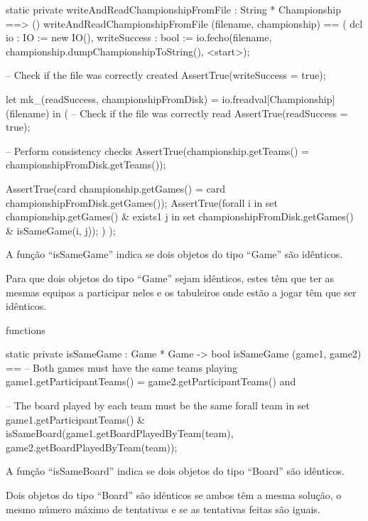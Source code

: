 \begin{vdm_al}  
    static private writeAndReadChampionshipFromFile : String * Championship ==> ()
    writeAndReadChampionshipFromFile (filename, championship) == (
      dcl io : IO := new IO(),
      writeSuccess : bool := io.fecho(filename, championship.dumpChampionshipToString(), <start>);
  
      -- Check if the file was correctly created
      AssertTrue(writeSuccess = true);
  
      let mk_(readSuccess, championshipFromDisk) = io.freadval[Championship](filename) in (
        -- Check if the file was correctly read
        AssertTrue(readSuccess = true);
  
        -- Perform consistency checks
        AssertTrue(championship.getTeams() = championshipFromDisk.getTeams());
  
        AssertTrue(card championship.getGames() = card championshipFromDisk.getGames());
        AssertTrue(forall i in set championship.getGames() &
          exists1 j in set championshipFromDisk.getGames() &
          isSameGame(i, j));
        )
      );
\end{vdm_al}  

A função ``isSameGame'' indica se dois objetos do tipo ``Game'' são
idênticos.

Para que dois objetos do tipo ``Game'' sejam idênticos, estes têm que
ter as mesmas equipas a participar neles e os tabuleiros onde estão a
jogar têm que ser idênticos.

\begin{vdm_al}  
    functions

    static private isSameGame : Game * Game -> bool
    isSameGame (game1, game2) ==
      -- Both games must have the same teams playing
      game1.getParticipantTeams() = game2.getParticipantTeams() and
  
      -- The board played by each team must be the same
      forall team in set game1.getParticipantTeams() &
        isSameBoard(game1.getBoardPlayedByTeam(team),
          game2.getBoardPlayedByTeam(team));
\end{vdm_al}  

A função ``isSameBoard'' indica se dois objetos do tipo ``Board'' são
idênticos.

Dois objetos do tipo ``Board'' são idênticos se ambos têm a mesma
solução, o mesmo número máximo de tentativas e se as tentativas feitas
são iguais.

